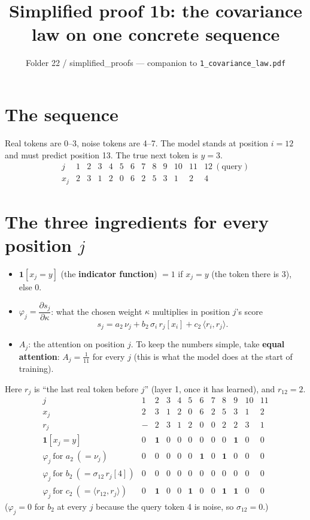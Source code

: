 \documentclass[11pt]{article}
\title{Simplified proof 1b: the covariance law on one concrete sequence}
\author{Folder 22 / simplified\_proofs --- companion to \texttt{1\_covariance\_law.pdf}}
\date{}
\newcommand{\1}{\mathbf{1}}
\begin{document}
\maketitle

\section{The sequence}
Real tokens are 0--3, noise tokens are 4--7. The model stands at position $i=12$ and must predict
position 13. The true next token is $y=3$.
\[
\begin{array}{c|ccccccccccc|c}
j & 1&2&3&4&5&6&7&8&9&10&11 & 12\ (\text{query})\\\hline
x_j & 2&3&1&2&0&6&2&5&3&1&2 & 4
\end{array}
\]

\section{The three ingredients for every position $j$}
\begin{itemize}
\item $\1[x_j = y]$ (the \textbf{indicator function}) $=1$ if $x_j = y$ (the token there is 3), else $0$.
\item $\varphi_j = \dfrac{\partial s_j}{\partial \kappa}$: what the chosen weight $\kappa$ multiplies in position $j$'s score
\[
s_j = a_2\,\nu_j + b_2\,\sigma_i\,r_j[x_i] + c_2\,\langle r_i, r_j\rangle .
\]
\item $A_j$: the attention on position $j$. To keep the numbers simple, take \textbf{equal attention}:
$A_j = \tfrac{1}{11}$ for every $j$ (this is what the model does at the start of training).
\end{itemize}

Here $r_j$ is ``the last real token before $j$'' (layer 1, once it has learned), and $r_{12}=2$.
\[
\begin{array}{l|ccccccccccc}
j & 1&2&3&4&5&6&7&8&9&10&11\\\hline
x_j & 2&3&1&2&0&6&2&5&3&1&2\\
r_j & -&2&3&1&2&0&0&2&2&3&1\\\hline
\1[x_j=y] & 0&\mathbf 1&0&0&0&0&0&0&\mathbf 1&0&0\\
\varphi_j\ \text{for } a_2\ (=\nu_j) & 0&0&0&0&0&\mathbf 1&0&\mathbf 1&0&0&0\\
\varphi_j\ \text{for } b_2\ (=\sigma_{12}\,r_j[4]) & 0&0&0&0&0&0&0&0&0&0&0\\
\varphi_j\ \text{for } c_2\ (=\langle r_{12},r_j\rangle) & 0&\mathbf 1&0&0&\mathbf 1&0&0&\mathbf 1&\mathbf 1&0&0
\end{array}
\]
($\varphi_j=0$ for $b_2$ at every $j$ because the query token 4 is noise, so $\sigma_{12}=0$.)
\end{document}
